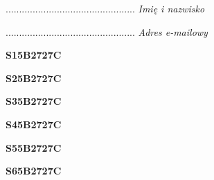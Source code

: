 \begin{turn}{90}\begin{minipage}{\linewidth} \vspace{20mm} ................................................  \textit{Imię i nazwisko}\end{minipage}\end{turn}

\begin{turn}{90}\begin{minipage}{\linewidth} \vspace{20mm} ................................................  \textit{Adres e-mailowy}\end{minipage}\end{turn}

\begin{turn}{90}\huge \begin{minipage}{\linewidth} \vspace{10mm}\textbf{S15B2727C}\end{minipage}\end{turn}

\begin{turn}{90}\huge \begin{minipage}{\linewidth} \vspace{10mm}\textbf{S25B2727C}\end{minipage}\end{turn}

\begin{turn}{90}\huge \begin{minipage}{\linewidth} \vspace{10mm}\textbf{S35B2727C}\end{minipage}\end{turn}

\begin{turn}{90}\huge \begin{minipage}{\linewidth} \vspace{10mm}\textbf{S45B2727C}\end{minipage}\end{turn}

\begin{turn}{90}\huge \begin{minipage}{\linewidth} \vspace{10mm}\textbf{S55B2727C}\end{minipage}\end{turn}

\begin{turn}{90}\huge \begin{minipage}{\linewidth} \vspace{10mm}\textbf{S65B2727C}\end{minipage}\end{turn}

